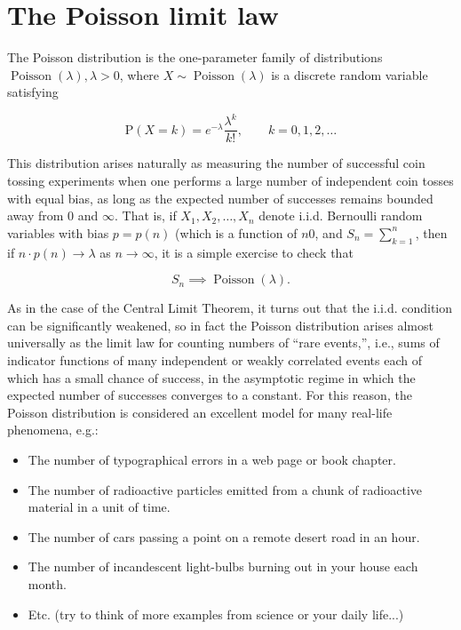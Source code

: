 \section{The Poisson limit law}
\label{sec:poisson-limit}

The Poisson distribution is the one-parameter family
of distributions
$\operatorname{Poisson}(\lambda), \lambda>0$, where
$X\sim \operatorname{Poisson}(\lambda)$ is a discrete
random variable satisfying

\[
\mathrm{P}(X=k) = e^{-\lambda} \frac{\lambda^k}{k!}, \qquad k=0,1,2,\ldots
\]

\noindent This distribution arises naturally as measuring the
number of successful coin tossing experiments when one
performs a large number of independent coin tosses
with equal bias, as long as the expected number of
successes remains bounded away from $0$ and $\infty$.
That is, if $X_1,X_2,\ldots,X_n$ denote i.i.d.
Bernoulli random variables with bias $p=p(n)$ (which
is a function of $n$0, and $S_n=\sum_{k=1}^n$, then
if $n\cdot p(n) \to \lambda$ as $n\to\infty$, it is a
simple exercise to check that

\begin{equation*}
\tag{20}\label{eq:law-small-numbers-iid}
S_n \implies \operatorname{Poisson}(\lambda).
\end{equation*}

\noindent As in the case of the Central Limit Theorem, it turns
out that the i.i.d. condition can be significantly
weakened, so in fact the Poisson distribution arises
almost universally as the limit law for counting
numbers of ``rare events,'', i.e., sums of indicator
functions of many independent or weakly correlated
events each of which has a small chance of success, in
the asymptotic regime in which the expected number of
successes converges to a constant. For this reason,
the Poisson distribution is considered an excellent
model for many real-life phenomena, e.g.:

\begin{itemize}
\item The number of typographical errors in a web page or
book chapter.

\item The number of radioactive particles emitted from a
chunk of radioactive material in a unit of time.

\item The number of cars passing a point on a remote desert
road in an hour.

\item The number of incandescent light-bulbs burning out in
your house each month.

\item Etc. (try to think of more examples from science or
your daily life...)
\end{itemize}

